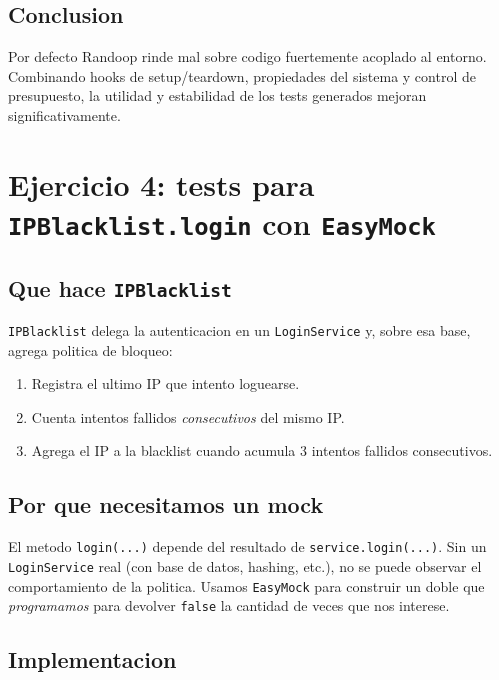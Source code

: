 \documentclass[12pt,a4paper]{article}
\begin{document}
\subsection{Conclusion}

Por defecto Randoop rinde mal sobre codigo fuertemente acoplado al entorno. Combinando
hooks de setup/teardown, propiedades del sistema y control de presupuesto, la utilidad y
estabilidad de los tests generados mejoran significativamente.

\section{Ejercicio 4: tests para \texttt{IPBlacklist.login} con \texttt{EasyMock}}

\subsection{Que hace \texttt{IPBlacklist}}

\texttt{IPBlacklist} delega la autenticacion en un \texttt{LoginService} y, sobre esa base,
agrega politica de bloqueo:

\begin{enumerate}
  \item Registra el ultimo IP que intento loguearse.
  \item Cuenta intentos fallidos \emph{consecutivos} del mismo IP.
  \item Agrega el IP a la blacklist cuando acumula 3 intentos fallidos consecutivos.
\end{enumerate}

\subsection{Por que necesitamos un mock}

El metodo \texttt{login(...)} depende del resultado de \texttt{service.login(...)}. Sin un
\texttt{LoginService} real (con base de datos, hashing, etc.), no se puede observar el
comportamiento de la politica. Usamos \texttt{EasyMock} para construir un doble que
\emph{programamos} para devolver \texttt{false} la cantidad de veces que nos interese.

\subsection{Implementacion}
\end{document}
